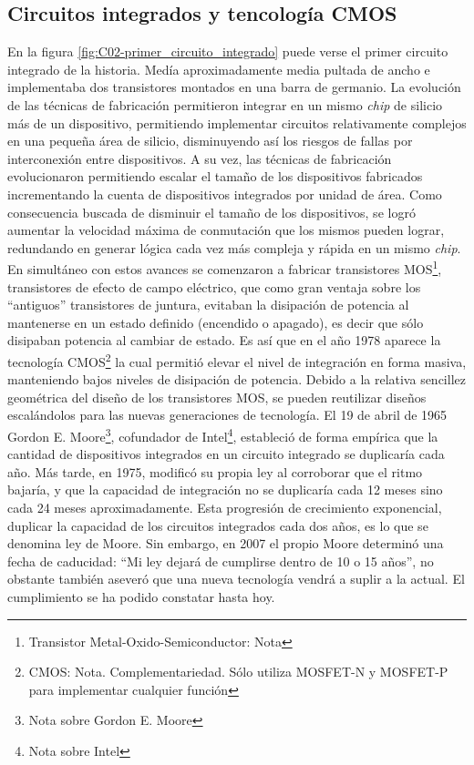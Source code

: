 \subsection{Circuitos integrados y tencología CMOS}

En la figura \ref{fig:C02-primer_circuito_integrado} puede verse el primer circuito integrado de la historia. Medía aproximadamente media pultada de ancho e implementaba dos transistores montados en una barra de germanio. La evolución de las técnicas de fabricación permitieron integrar en un mismo \emph{chip} de silicio más de un dispositivo, permitiendo implementar circuitos relativamente complejos en una pequeña área de silicio, disminuyendo así los riesgos de fallas por interconexión entre dispositivos. A su vez, las técnicas de fabricación evolucionaron permitiendo escalar el tamaño de los dispositivos fabricados incrementando la cuenta de dispositivos integrados por unidad de área. Como consecuencia buscada de disminuir el tamaño de los dispositivos, se logró aumentar la velocidad máxima de conmutación que los mismos pueden lograr, redundando en generar lógica cada vez más compleja y rápida en un mismo \emph{chip}. En simultáneo con estos avances se comenzaron a fabricar transistores MOS\footnote{Transistor Metal-Oxido-Semiconductor: Nota}, transistores de efecto de campo eléctrico, que como gran ventaja sobre los ``antiguos'' transistores de juntura, evitaban la disipación de potencia al mantenerse en un estado definido (encendido o apagado), es decir que sólo disipaban potencia al cambiar de estado. Es así que en el año 1978 aparece la tecnología CMOS\footnote{CMOS: Nota. Complementariedad. Sólo utiliza MOSFET-N y MOSFET-P para implementar cualquier función} la cual permitió elevar el nivel de integración en forma masiva, manteniendo bajos niveles de disipación de potencia. Debido a la relativa sencillez geométrica del diseño de los transistores MOS, se pueden reutilizar diseños escalándolos para las nuevas generaciones de tecnología. El 19 de abril de 1965 Gordon E. Moore\footnote{Nota sobre Gordon E. Moore}, cofundador de Intel\footnote{Nota sobre Intel}, estableció de forma empírica que la cantidad de dispositivos integrados en un circuito integrado se duplicaría cada año. Más tarde, en 1975, modificó su propia ley al corroborar que el ritmo bajaría, y que la capacidad de integración no se duplicaría cada 12 meses sino cada 24 meses aproximadamente. Esta progresión de crecimiento exponencial, duplicar la capacidad de los circuitos integrados cada dos años, es lo que se denomina ley de Moore. Sin embargo, en 2007 el propio Moore determinó una fecha de caducidad: ``Mi ley dejará de cumplirse dentro de 10 o 15 años'', no obstante también aseveró que una nueva tecnología vendrá a suplir a la actual. El cumplimiento se ha podido constatar hasta hoy.

